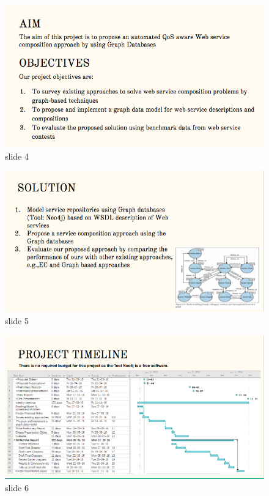 \begin{figure}[h]
\includegraphics[width=15cm]{4.png}
\centering
\caption{slide 4}
\end{figure}

\begin{figure}[h]
\includegraphics[width=15cm]{5.png}
\centering
\caption{slide 5}
\end{figure}

\begin{figure}[h]
\includegraphics[width=15cm]{6.png}
\centering
\caption{slide 6}
\end{figure}

